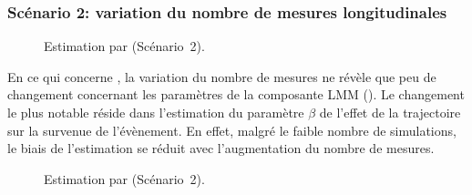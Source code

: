 \documentclass[11pt, a4paper]{article}
\begin{document}
\subsubsection{Scénario 2: variation du nombre de mesures longitudinales\label{sec:S2}}
\begin{figure}[ht]
    \begin{center}
    \end{center}
    \vspace{-15pt}
    \caption{Estimation par  (Scénario~2).}
    \label{fig:S2JM}
\end{figure}
\par{En ce qui concerne , la variation du nombre de mesures ne révèle que peu de changement concernant
les paramètres de la composante LMM ().
Le changement le plus notable réside dans l’estimation du paramètre $\beta$ de l’effet de la trajectoire
sur la survenue de l’évènement.
En effet, malgré le faible nombre de simulations, le biais de l’estimation se réduit avec l'augmentation du nombre
de mesures.}
\begin{figure}[ht]
    \begin{center}
    \end{center}
    \vspace{-15pt}
    \caption{Estimation par  (Scénario~2).}
    \label{fig:S2joineR}
\end{figure}
\end{document}
